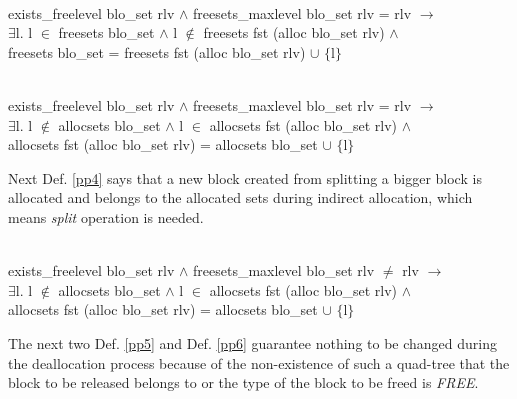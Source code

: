 \begin{definition}  \\
	exists\_freelevel blo\_set rlv $\wedge$ freesets\_maxlevel blo\_set rlv = rlv $\longrightarrow$ \\
	\phantom{x} \hspace{10pt} $\exists$l. l $\in$ freesets blo\_set $\wedge$ l $\notin$ freesets fst (alloc blo\_set rlv) $\wedge$ \\
	\phantom{x} \hspace{10pt} freesets blo\_set = freesets fst (alloc blo\_set rlv) $\cup$ $\lbrace$l$\rbrace$
	\label{pp2}
\end{definition}

\begin{definition}  \\
	exists\_freelevel blo\_set rlv $\wedge$ freesets\_maxlevel blo\_set rlv = rlv $\longrightarrow$ \\
	\phantom{x} \hspace{10pt} $\exists$l. l $\notin$ allocsets blo\_set $\wedge$ l $\in$ allocsets fst (alloc blo\_set rlv) $\wedge$ \\
	\phantom{x} \hspace{10pt} allocsets fst (alloc blo\_set rlv) = allocsets blo\_set $\cup$ $\lbrace$l$\rbrace$
	\label{pp3}
\end{definition}

Next Def. \ref{pp4} says that a new block created from splitting a bigger block is allocated and belongs to the allocated sets during indirect allocation, which means \emph{split} operation is needed.

\begin{definition}  \\
	exists\_freelevel blo\_set rlv $\wedge$ freesets\_maxlevel blo\_set rlv $\neq$ rlv $\longrightarrow$ \\
	\phantom{x} \hspace{10pt} $\exists$l. l $\notin$ allocsets blo\_set $\wedge$ l $\in$ allocsets fst (alloc blo\_set rlv) $\wedge$ \\
	\phantom{x} \hspace{10pt} allocsets fst (alloc blo\_set rlv) = allocsets blo\_set $\cup$ $\lbrace$l$\rbrace$
	\label{pp4}
\end{definition}

The next two Def. \ref{pp5} and Def. \ref{pp6} guarantee nothing to be changed during the deallocation process because of the non-existence of such a quad-tree that the block to be released belongs to or the type of the block to be freed is \emph{FREE}.

